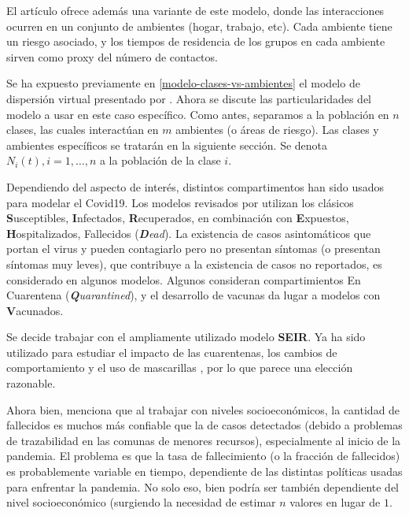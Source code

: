 El artículo \cite{Bichara2015} ofrece además una variante de este modelo, donde las interacciones ocurren en un conjunto de ambientes (hogar, trabajo, etc). Cada ambiente tiene un riesgo asociado, y los tiempos de residencia de los grupos en cada ambiente sirven como proxy del número de contactos. 

Se ha expuesto previamente en \ref{modelo-clases-vs-ambientes} el modelo de dispersión virtual presentado por \cite{Bichara2015}. Ahora se discute las particularidades del modelo a usar en este caso específico. Como antes, separamos a la población en \(n\) clases, las cuales interactúan en \(m\) ambientes (o áreas de riesgo). Las clases y ambientes específicos se tratarán en  la siguiente sección. Se denota \(N_i(t), i = 1, \dots, n\) a la población de la clase \(i\).



Dependiendo del aspecto de interés, distintos compartimentos han sido usados para modelar el Covid19. Los modelos revisados por \cite{Xiang2021} utilizan los clásicos \textbf{S}usceptibles, \textbf{I}nfectados, \textbf{R}ecuperados, en combinación con \textbf{E}xpuestos, \textbf{H}ospitalizados, Fallecidos (\textit{\textbf{D}ead}). La existencia de casos asintomáticos que portan el virus y pueden contagiarlo pero no presentan síntomas (o presentan síntomas muy leves), que contribuye a la existencia de casos no reportados, es considerado en algunos modelos. Algunos consideran compartimientos En Cuarentena (\textit{\textbf{Q}uarantined}), y el desarrollo de vacunas da lugar a modelos con \textbf{V}acunados.

Se decide trabajar con el ampliamente utilizado \cite{} modelo \textbf{SEIR}. Ya ha sido utilizado para estudiar el impacto de las cuarentenas, los cambios de comportamiento y el uso de mascarillas \cite{}, por lo que parece una elección razonable. 

Ahora bien, \cite{Mena2021} menciona que al trabajar con niveles socioeconómicos, la cantidad de fallecidos es muchos más confiable que la de casos detectados (debido a problemas de trazabilidad en las comunas de menores recursos), especialmente al inicio de la pandemia. El problema es que la tasa de fallecimiento (o la fracción de fallecidos) es probablemente variable en tiempo, dependiente de las distintas políticas usadas para enfrentar la pandemia. No solo eso, bien podría ser también dependiente del nivel socioeconómico \cite{} (surgiendo la necesidad de estimar \(n\) valores en lugar de \(1\). 

